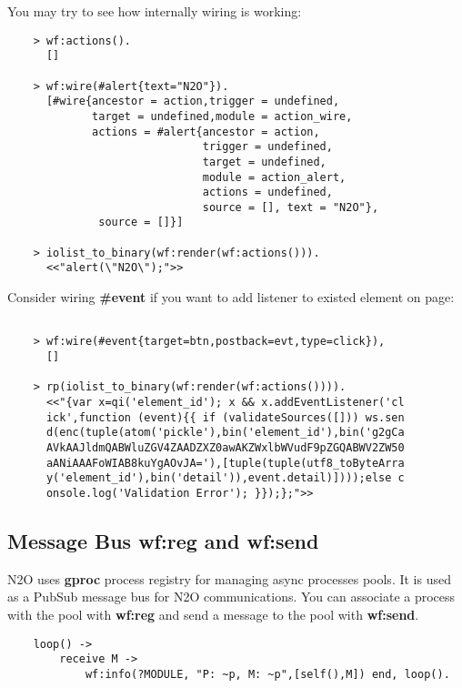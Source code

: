 You may try to see how internally wiring is working:

\begin{lstlisting}
    > wf:actions().
      []

    > wf:wire(#alert{text="N2O"}).
      [#wire{ancestor = action,trigger = undefined,
             target = undefined,module = action_wire,
             actions = #alert{ancestor = action,
                              trigger = undefined,
                              target = undefined,
                              module = action_alert,
                              actions = undefined,
                              source = [], text = "N2O"},
              source = []}]

    > iolist_to_binary(wf:render(wf:actions())).
      <<"alert(\"N2O\");">>
\end{lstlisting}

Consider wiring {\bf \#event} if you want to add listener to
existed element on page:

\vspace{1\baselineskip}
\begin{lstlisting}

    > wf:wire(#event{target=btn,postback=evt,type=click}),
      []

    > rp(iolist_to_binary(wf:render(wf:actions()))).
      <<"{var x=qi('element_id'); x && x.addEventListener('cl
      ick',function (event){{ if (validateSources([])) ws.sen
      d(enc(tuple(atom('pickle'),bin('element_id'),bin('g2gCa
      AVkAAJldmQABWluZGV4ZAADZXZ0awAKZWxlbWVudF9pZGQABWV2ZW50
      aANiAAAFoWIAB8kuYgAOvJA='),[tuple(tuple(utf8_toByteArra
      y('element_id'),bin('detail')),event.detail)])));else c
      onsole.log('Validation Error'); }});};">>
\end{lstlisting}


\newpage
\subsection{Message Bus {\bf wf:reg} and {\bf wf:send}}
N2O uses {\bf gproc} process registry for managing async processes pools.
It is used as a PubSub message bus for N2O communications.
You can associate a process with the pool with {\bf wf:reg}
and send a message to the pool with {\bf wf:send}.

\vspace{1\baselineskip}
\begin{lstlisting}
    loop() ->
        receive M ->
            wf:info(?MODULE, "P: ~p, M: ~p",[self(),M]) end, loop().
\end{lstlisting}

